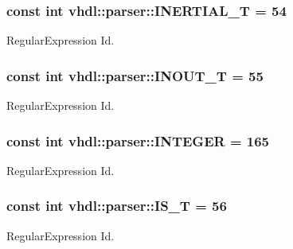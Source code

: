 \subsubsection[{I\+N\+E\+R\+T\+I\+A\+L\+\_\+\+T}]{\setlength{\rightskip}{0pt plus 5cm}const int vhdl\+::parser\+::\+I\+N\+E\+R\+T\+I\+A\+L\+\_\+\+T = 54}\label{namespacevhdl_1_1parser_af211442cf9b2542a35ed9237208dbd5a}
Regular\+Expression Id. \hypertarget{namespacevhdl_1_1parser_a43244e8e1a5fffa380008ef2f4db721b}{}
\subsubsection[{I\+N\+O\+U\+T\+\_\+\+T}]{\setlength{\rightskip}{0pt plus 5cm}const int vhdl\+::parser\+::\+I\+N\+O\+U\+T\+\_\+\+T = 55}\label{namespacevhdl_1_1parser_a43244e8e1a5fffa380008ef2f4db721b}
Regular\+Expression Id. \hypertarget{namespacevhdl_1_1parser_af78eb7289072e15fe0daab58af957338}{}
\subsubsection[{I\+N\+T\+E\+G\+E\+R}]{\setlength{\rightskip}{0pt plus 5cm}const int vhdl\+::parser\+::\+I\+N\+T\+E\+G\+E\+R = 165}\label{namespacevhdl_1_1parser_af78eb7289072e15fe0daab58af957338}
Regular\+Expression Id. \hypertarget{namespacevhdl_1_1parser_a565c82488a33302b0e2a2bdaff494efc}{}
\subsubsection[{I\+S\+\_\+\+T}]{\setlength{\rightskip}{0pt plus 5cm}const int vhdl\+::parser\+::\+I\+S\+\_\+\+T = 56}\label{namespacevhdl_1_1parser_a565c82488a33302b0e2a2bdaff494efc}
Regular\+Expression Id. \hypertarget{namespacevhdl_1_1parser_a48bdc5c58eb15649c61b2d623bcbdc29}{}
